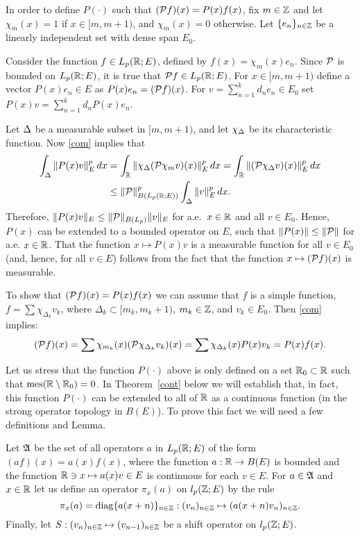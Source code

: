\begin{pf}
In order to define $P(\cdot)$ such that
$({\cal{P}} f)(x) =P(x) f(x)$, fix $m\in {\Bbb{Z}}$ and let $\chi_m
(x)=1$ if $x\in [m,m+1)$, and $\chi_m (x) =0$ otherwise.
Let $\{e_n\}_{n\in{\Bbb{Z}}}$ be a linearly independent set with dense
span $E_0$.

Consider the function
$f\in L_p ({\Bbb{R}};E)$, defined by $f(x) =\chi_m (x) e_n$.
Since ${\cal{P}}$ is
bounded on $L_p({\Bbb{R}};E)$, it is true that ${\cal{P}} f\in L_p ({\Bbb{R}};E)$.
For
$x\in [m, m+1)$ define
a vector $P(x) e_n\in E$ as $P(x) e_n =({\cal{P}} f)(x)$.
For $v=\sum_{n=1}^k d_n e_n \in E_0$
set $P(x) v=\sum_{n=1}^k d_n P(x)
e_n$.

Let $\Delta$ be a measurable subset in $[m, m+1)$, and let $\chi_\Delta$ be its
characteristic function.  Now  \eqref{com} implies that
\begin{align*}
\int_\Delta \| P(x) v\|_E^p \, dx &=
\int_{{\Bbb{R}}} \| \chi_\Delta ({\cal{P}}\chi_m v)(x)
\|_E^p \, dx =
\int_{{\Bbb{R}}} \| ({\cal{P}}\chi_\Delta v)(x) \|_E^p \, dx \\
& \leq \| {\cal{P}} \|_{B(L_p ({\Bbb{R}};E))}^p \int_\Delta \|v\|_E^p \, dx.
\end{align*}
Therefore, $\|P(x) v\|_E \leq \|{\cal{P}}\|_{B(L_p)} \|v\|_E$
for a.e.\ $x\in {\Bbb{R}}$ and all
$v\in E_0$.  Hence, $P(x)$ can be extended to a bounded operator on $E$,
such that $\|P(x) \| \leq \| {\cal{P}}\|$ for a.e. $x\in{\Bbb{R}}$.  That
the function $x\mapsto P(x) v$ is
a measurable function
for all $v\in E_0$ (and, hence, for all $v\in E$) follows from the fact that
the function $x\mapsto
({\cal{P}} f) (x)$ is measurable.

To show that $({\cal{P}} f)(x) = P(x)f(x)$ we can assume that $f$ is
a simple function, $f=\sum\chi_{\Delta_k}v_k$, where
$\Delta_k \subset [m_k, m_k+1)$, $m_k\in {\Bbb{Z}}$,
and $v_k\in E_0$. Then \eqref{com}
implies:
$$({\cal{P}} f)(x)=\sum \chi_{m_k}(x)({\cal{P}} \chi_{\Delta_k}v_k)(x)=
\sum\chi_{\Delta_k}(x)P(x)v_k = P(x)f(x).
$$
\end{pf}

Let us stress that the function $P(\cdot )$ above is only defined
on a set ${\Bbb{R}}_0\subset{\Bbb{R}}$ such that $\operatorname{mes} ({\Bbb{R}}\setminus{\Bbb{R}}_0) = 0$.
In Theorem~\ref{cont} below we will establish that, in fact,
this function
$P(\cdot)$ can be extended to all of ${\Bbb{R}}$ as
a continuous function (in the strong
operator topology in $B(E)$).  To prove
this fact we will need a few definitions and Lemma.

Let ${\frak{A}}$ be the set of all operators $a$ in $L_p({\Bbb{R}};E)$ of
the form $(af)(x) =a(x) f(x)$,
where the function $a:{\Bbb{R}} \to B(E)$ is bounded
and the function
${\Bbb{R}} \ni x \mapsto a(x) v\in E$ is continuous for each $v\in E$.
For $a\in{\frak{A}}$ and $x\in{\Bbb{R}}$ let us define an
operator $\pi_x (a)$ on $l_p ({\Bbb{Z}};E)$ by the rule
\begin{equation}
\pi_x (a) =\diag \{a(x+n)\}_{n\in\bbZ}: (v_n)_{n\in\bbZ} \mapsto (a(x+n)
v_n)_{n\in\bbZ}.
\lb{pi}
\end{equation}
Finally, let $S: (v_n)_{n\in{\Bbb{Z}}} \mapsto (v_{n-1})_{n\in{\Bbb{Z}}}$ be a
shift operator on $l_p ({\Bbb{Z}};E)$.

